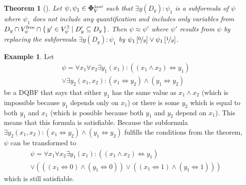 \documentclass[
  digital, %
  twoside, %
  table,   %
  nolof,     %
  nolot,     %
]{fithesis3}
\let\setbuilder\set
\newcommand{\simpleset}[1]{\{{#1}\}}
\renewcommand{\set}[1]{\normalexpandarg\IfSubStr{#1}{|}{\setbuilder{#1}}{\simpleset{#1}}}
\newtheorem{theorem}{Theorem}[chapter] %
\theoremstyle{definition}
\newtheorem{example}{Example}
\theoremstyle{remark}
\newcommand{\substitute}[2]{\left[ \nicefrac{#2}{#1} \right]}
\newcommand{\DQBF}[1]{\mathbf{\Phi}_{#1}^{\text{\tiny dnnf}}}
\newcommand{\lequal}{\Leftrightarrow}
\begin{document}
\begin{theorem}[{\cite[Theorem 5]{HQSquantifierLocalization}}]
\label{thrm:exElim}
  Let $\psi, \psi_1 \in \DQBF{V}$ such that $\exists y(D_y) : \psi_1$ is a subformula of $\psi$ where $\psi_1$ does not include any quantification and includes only variables from $D_y \cap V_{\psi}^{\text{free}} \cap \set{y' \in V_{\psi}^{\exists} | D_y' \subseteq D_y}$. Then $\psi \approx \psi'$ where $\psi'$ results from $\psi$ by replacing the subformula $\exists y(D_y) : \psi_1$ by $\psi_1\substitute{y}{0} \lor \psi_1\substitute{y}{1}$.
\end{theorem}
\begin{example}
Let
\begin{multline*}
\psi = \forall x_1 \forall x_2 \exists y_1(x_1) : ((x_1 \land x_2) \lequal y_1)\\
\lor \exists y_2 (x_1,x_2) : (x_1 \lequal y_2) \land (y_1 \lequal y_2)
\end{multline*}
be a DQBF that says that either $y_1$ has the same value as $x_1 \land x_2$ (which is impossible because $y_1$ depends only on $x_1$) or there is some $y_2$ which is equal to both $y_1$ and $x_1$ (which is possible because both $y_1$ and $y_2$ depend on $x_1$). This means that this formula is satisfiable. Because the subformula $\exists y_2 (x_1,x_2) : (x_1 \lequal y_2) \land (y_1 \lequal y_2)$ fulfills the conditions from the theorem, $\psi$ can be transformed to
\begin{multline*}
\psi = \forall x_1 \forall x_2 \exists y_1(x_1) : ((x_1 \land x_2) \lequal y_1)\\
\lor (((x_1 \lequal 0) \land (y_1 \lequal 0)) \lor ((x_1 \lequal 1) \land (y_1 \lequal 1)))
\end{multline*}
which is still satisfiable.
\end{example}



\end{document}
